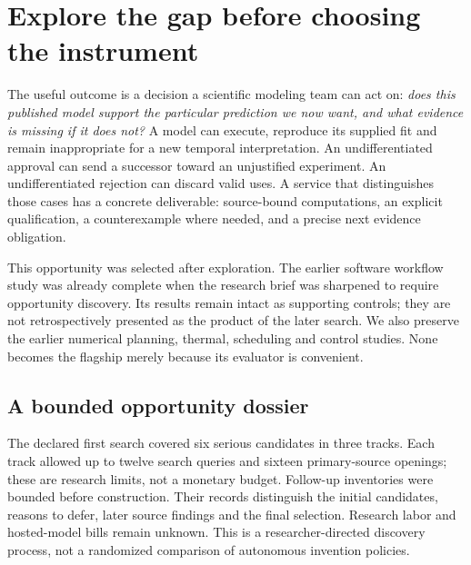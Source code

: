 \section{Explore the gap before choosing the instrument}
The useful outcome is a decision a scientific modeling team can act on: \emph{does this published model support the particular prediction we now want, and what evidence is missing if it does not?} A model can execute, reproduce its supplied fit and remain inappropriate for a new temporal interpretation. An undifferentiated approval can send a successor toward an unjustified experiment. An undifferentiated rejection can discard valid uses. A service that distinguishes those cases has a concrete deliverable: source-bound computations, an explicit qualification, a counterexample where needed, and a precise next evidence obligation.

This opportunity was selected after exploration. The earlier software workflow study was already complete when the research brief was sharpened to require opportunity discovery. Its results remain intact as supporting controls; they are not retrospectively presented as the product of the later search. We also preserve the earlier numerical planning, thermal, scheduling and control studies. None becomes the flagship merely because its evaluator is convenient.

\subsection{A bounded opportunity dossier}
The declared first search covered six serious candidates in three tracks. Each track allowed up to twelve search queries and sixteen primary-source openings; these are research limits, not a monetary budget. Follow-up inventories were bounded before construction. Their records distinguish the initial candidates, reasons to defer, later source findings and the final selection. Research labor and hosted-model bills remain unknown. This is a researcher-directed discovery process, not a randomized comparison of autonomous invention policies.

